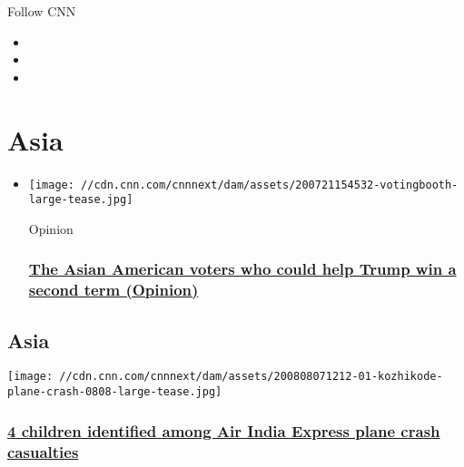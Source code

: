 Follow CNN

\begin{itemize}
\item
\item
\item
\end{itemize}

\hypertarget{asia}{%
\section{Asia}\label{asia}}

\begin{itemize}
\item
  \href{/2020/08/05/opinions/asian-american-vietnamese-trump-election-vu/index.html}{}

  \texttt{[image: //cdn.cnn.com/cnnnext/dam/assets/200721154532-votingbooth-large-tease.jpg]}

  Opinion

  \hypertarget{the-asian-american-voters-who-could-help-trump-win-a-second-term-opinion}{%
  \subsubsection{\texorpdfstring{\href{/2020/08/05/opinions/asian-american-vietnamese-trump-election-vu/index.html}{The
  Asian American voters who could help Trump win a second term
  (Opinion)}}{The Asian American voters who could help Trump win a second term (Opinion)}}\label{the-asian-american-voters-who-could-help-trump-win-a-second-term-opinion}}
\end{itemize}

\hypertarget{asia-1}{%
\subsection{Asia}\label{asia-1}}

\href{/2020/08/08/asia/air-india-express-plane-crash-kerala-intl/index.html}{}

\texttt{[image: //cdn.cnn.com/cnnnext/dam/assets/200808071212-01-kozhikode-plane-crash-0808-large-tease.jpg]}

\hypertarget{4-children-identified-among-air-india-express-plane-crash-casualties}{%
\subsubsection{\texorpdfstring{\href{/2020/08/08/asia/air-india-express-plane-crash-kerala-intl/index.html}{4
children identified among Air India Express plane crash
casualties}}{4 children identified among Air India Express plane crash casualties}}\label{4-children-identified-among-air-india-express-plane-crash-casualties}}

